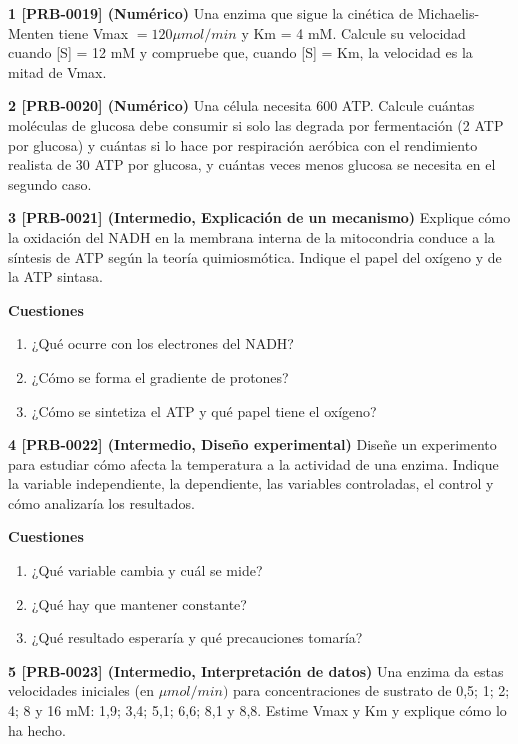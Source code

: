\documentclass{book}
\begin{document}
\begin{tcolorbox}[title={Ejercicios}, studiumworked, breakable]

\noindent\textbf{1 [PRB-0019] (Numérico)}
Una enzima que sigue la cinética de Michaelis-Menten tiene Vmax \(= 120 \mu mol/min\) y Km = 4 mM. Calcule su velocidad cuando [S] = 12 mM y compruebe que, cuando [S] = Km, la velocidad es la mitad de Vmax.


\noindent\textbf{2 [PRB-0020] (Numérico)}
Una célula necesita 600 ATP. Calcule cuántas moléculas de glucosa debe consumir si solo las degrada por fermentación (2 ATP por glucosa) y cuántas si lo hace por respiración aeróbica con el rendimiento realista de 30 ATP por glucosa, y cuántas veces menos glucosa se necesita en el segundo caso.


\noindent\textbf{3 [PRB-0021] (Intermedio, Explicación de un mecanismo)}
Explique cómo la oxidación del NADH en la membrana interna de la mitocondria conduce a la síntesis de ATP según la teoría quimiosmótica. Indique el papel del oxígeno y de la ATP sintasa.


\noindent\textbf{Cuestiones}
\begin{enumerate}
\item ¿Qué ocurre con los electrones del NADH?
\item ¿Cómo se forma el gradiente de protones?
\item ¿Cómo se sintetiza el ATP y qué papel tiene el oxígeno?
\end{enumerate}

\noindent\textbf{4 [PRB-0022] (Intermedio, Diseño experimental)}
Diseñe un experimento para estudiar cómo afecta la temperatura a la actividad de una enzima. Indique la variable independiente, la dependiente, las variables controladas, el control y cómo analizaría los resultados.


\noindent\textbf{Cuestiones}
\begin{enumerate}
\item ¿Qué variable cambia y cuál se mide?
\item ¿Qué hay que mantener constante?
\item ¿Qué resultado esperaría y qué precauciones tomaría?
\end{enumerate}

\noindent\textbf{5 [PRB-0023] (Intermedio, Interpretación de datos)}
Una enzima da estas velocidades iniciales (en \(\mu mol/min)\) para concentraciones de sustrato de 0,5; 1; 2; 4; 8 y 16 mM: 1,9; 3,4; 5,1; 6,6; 8,1 y 8,8. Estime Vmax y Km y explique cómo lo ha hecho.



\end{tcolorbox}
\end{document}

